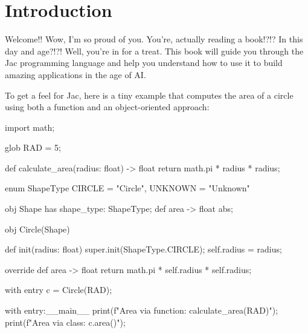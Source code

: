 \chapter{Introduction}

Welcome!! Wow, I'm so proud of you. You're, actually reading a book!?!? In this day and age?!?! Well, you're in for a treat. This book will guide you through the Jac programming language and help you understand how to use it to build amazing applications in the age of AI.

To get a feel for Jac, here is a tiny example that computes the area of a circle using both a function and an object-oriented approach:

\begin{jacblock}[caption={A tiny Jac program: circle area via function and class}]
import math;

glob RAD = 5;

def calculate_area(radius: float) -> float {
    return math.pi * radius * radius;
}

enum ShapeType {
    CIRCLE = "Circle",
    UNKNOWN = "Unknown"
}

obj Shape {
    has shape_type: ShapeType;
    def area -> float abs;
}

obj Circle(Shape) {
    def init(radius: float) {
        super.init(ShapeType.CIRCLE);
        self.radius = radius;
    }

    override def area -> float {
        return math.pi * self.radius * self.radius;
    }
}

with entry {
    c = Circle(RAD);
}

with entry:__main__ {
    print(f"Area via function: {calculate_area(RAD)}");
    print(f"Area via class: {c.area()}");
}
\end{jacblock}
